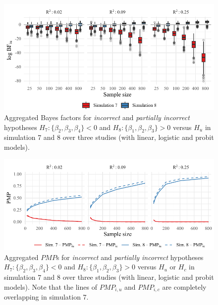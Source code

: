 \documentclass[
]{interact}
\begin{document}
\begin{figure}[!t]

{\centering \includegraphics[width=1\textwidth,height=\textheight]{manuscript_VK_files/figure-pdf/fig-BF78-1.pdf}

}

\caption{\label{fig-BF78}Aggregated Bayes factors for \textit{incorrect}
and \textit{partially incorrect} hypotheses
\(H_7: \{\beta_2, \beta_3, \beta_4\} < 0\) and
\(H_8: \{\beta_1, \beta_2, \beta_3\} > 0\) versus \(H_u\) in simulation
7 and 8 over three studies (with linear, logistic and probit models).}

\end{figure}

\begin{figure}[!t]

{\centering \includegraphics[width=1\textwidth,height=\textheight]{manuscript_VK_files/figure-pdf/fig-PMP78-1.pdf}

}

\caption{\label{fig-PMP78}Aggregated \(PMP\)s for \textit{incorrect} and
\textit{partially incorrect} hypotheses
\(H_7: \{\beta_2, \beta_3, \beta_4\} < 0\) and
\(H_8: \{\beta_1, \beta_2, \beta_3\} > 0\) versus \(H_u\) or \(H_c\) in
simulation 7 and 8 over three studies (with linear, logistic and probit
models). Note that the lines of \(PMP_{i,u}\) and \(PMP_{i,c}\) are
completely overlapping in simulation 7.}

\end{figure}
\end{document}
